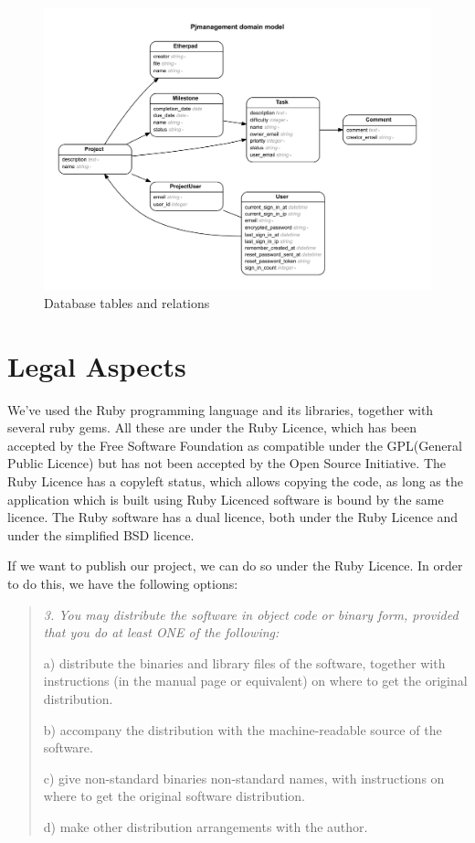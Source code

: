 \documentclass[a4wide, 11pt]{article}
\newenvironment{italicquotes}
{\begin{quote}\itshape\small}
{\end{quote}}
\begin{document}
\begin{figure}
  \includegraphics[width=1\textwidth]{erd.pdf}
  \caption{Database tables and relations}
  \label{fig:db}
\end{figure}
\clearpage

\section{Legal Aspects}

We've used the Ruby programming language and its libraries, together with
several ruby gems. All these are under the Ruby Licence, which has been
accepted by the Free Software Foundation as compatible under the GPL(General
Public Licence)\cite{GNUlicence} but has not been accepted by the Open Source
Initiative. The Ruby Licence has a copyleft status, which allows copying the
code, as long as the application which is built using Ruby Licenced software is
bound by the same licence. The Ruby software has a dual licence, both under the
Ruby Licence and under the simplified BSD licence.

If we want to publish our project, we can do so under the Ruby Licence.
In order to do this, we have the following options:

\begin{italicquotes}
3. You may distribute the software in object code or binary form,
   provided that you do at least ONE of the following:

a) distribute the binaries and library files of the software,
together with instructions (in the manual page or equivalent)
on where to get the original distribution.

b) accompany the distribution with the machine-readable source of
the software.

c) give non-standard binaries non-standard names, with
instructions on where to get the original software distribution.

d) make other distribution arrangements with the author.
     \cite{Rubylicence}
\end{italicquotes}
\end{document}
